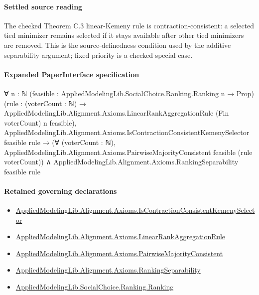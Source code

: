 \documentclass[10pt]{article}
\begin{document}
\paragraph{Settled source reading}
\begin{sloppypar}
The checked Theorem C.\allowbreak{}3 linear-\allowbreak{}Kemeny rule is contraction-\allowbreak{}consistent:\allowbreak{} a selected tied minimizer remains selected if it stays available after other tied minimizers are removed.\allowbreak{} This is the source-\allowbreak{}definedness condition used by the additive separability argument;\allowbreak{} fixed priority is a checked special case.\allowbreak{}
\end{sloppypar}

\paragraph{Expanded PaperInterface specification}
\begin{ReviewVerbatim}
∀ {n : ℕ} (feasible : AppliedModelingLib.SocialChoice.Ranking.Ranking n → Prop)
  (rule : (voterCount : ℕ) → AppliedModelingLib.Alignment.Axioms.LinearRankAggregationRule (Fin voterCount) n feasible),
  AppliedModelingLib.Alignment.Axioms.IsContractionConsistentKemenySelector feasible rule →
    (∀ (voterCount : ℕ), AppliedModelingLib.Alignment.Axioms.PairwiseMajorityConsistent feasible (rule voterCount)) ∧
      AppliedModelingLib.Alignment.Axioms.RankingSeparability feasible rule
\end{ReviewVerbatim}

\paragraph{Retained governing declarations}
\begin{itemize}\raggedright
\item \hyperlink{governing-declaration-7a9b6acd96f5c9cf}{Applied\allowbreak{}Modeling\allowbreak{}Lib.\allowbreak{}Alignment.\allowbreak{}Axioms.\allowbreak{}Is\allowbreak{}Contraction\allowbreak{}Consistent\allowbreak{}Kemeny\allowbreak{}Selector}
\item \hyperlink{library-prerequisite-43447e121a1884f9}{Applied\allowbreak{}Modeling\allowbreak{}Lib.\allowbreak{}Alignment.\allowbreak{}Axioms.\allowbreak{}Linear\allowbreak{}Rank\allowbreak{}Aggregation\allowbreak{}Rule}
\item \hyperlink{library-prerequisite-e6dee3706881b80a}{Applied\allowbreak{}Modeling\allowbreak{}Lib.\allowbreak{}Alignment.\allowbreak{}Axioms.\allowbreak{}Pairwise\allowbreak{}Majority\allowbreak{}Consistent}
\item \hyperlink{library-prerequisite-ad3d3904c31ec7b5}{Applied\allowbreak{}Modeling\allowbreak{}Lib.\allowbreak{}Alignment.\allowbreak{}Axioms.\allowbreak{}Ranking\allowbreak{}Separability}
\item \hyperlink{library-prerequisite-5cde54446d1ae021}{Applied\allowbreak{}Modeling\allowbreak{}Lib.\allowbreak{}Social\allowbreak{}Choice.\allowbreak{}Ranking.\allowbreak{}Ranking}
\end{itemize}
\end{document}
